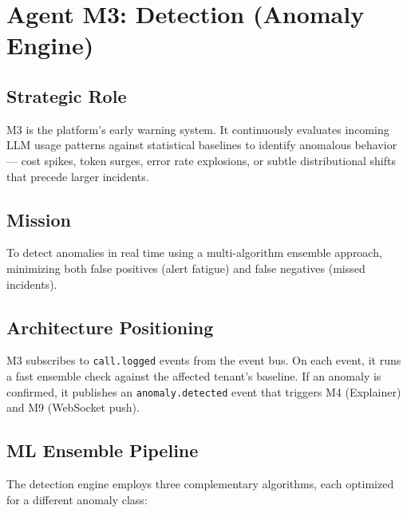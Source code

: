 \documentclass[12pt,a4paper,twoside]{report}
\begin{document}
\section{Agent M3: Detection (Anomaly Engine)}

\subsection{Strategic Role}
M3 is the platform's early warning system. It continuously evaluates incoming LLM usage patterns against statistical baselines to identify anomalous behavior — cost spikes, token surges, error rate explosions, or subtle distributional shifts that precede larger incidents.

\subsection{Mission}
To detect anomalies in real time using a multi-algorithm ensemble approach, minimizing both false positives (alert fatigue) and false negatives (missed incidents).

\subsection{Architecture Positioning}
M3 subscribes to \texttt{call.logged} events from the event bus. On each event, it runs a fast ensemble check against the affected tenant's baseline. If an anomaly is confirmed, it publishes an \texttt{anomaly.detected} event that triggers M4 (Explainer) and M9 (WebSocket push).

\subsection{ML Ensemble Pipeline}

The detection engine employs three complementary algorithms, each optimized for a different anomaly class:
\end{document}

